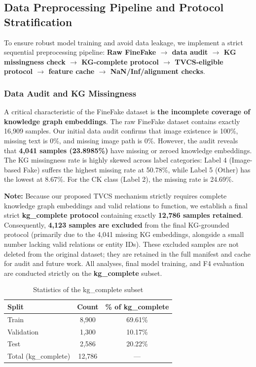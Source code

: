 \subsection{Data Preprocessing Pipeline and Protocol Stratification}

To ensure robust model training and avoid data leakage, we implement a strict sequential preprocessing pipeline: \textbf{Raw FineFake $\rightarrow$ data audit $\rightarrow$ KG missingness check $\rightarrow$ KG-complete protocol $\rightarrow$ TVCS-eligible protocol $\rightarrow$ feature cache $\rightarrow$ NaN/Inf/alignment checks}.

\subsubsection{Data Audit and KG Missingness}
A critical characteristic of the FineFake dataset is \textbf{the incomplete coverage of knowledge graph embeddings}. The raw FineFake dataset contains exactly 16,909 samples. Our initial data audit confirms that image existence is 100\%, missing text is 0\%, and missing image path is 0\%. However, the audit reveals that \textbf{4,041 samples (23.8985\%)} have missing or zeroed knowledge embeddings. The KG missingness rate is highly skewed across label categories: Label 4 (Image-based Fake) suffers the highest missing rate at 50.78\%, while Label 5 (Other) has the lowest at 8.67\%. For the CK class (Label 2), the missing rate is 24.69\%.

\textbf{Note:} Because our proposed TVCS mechanism strictly requires complete knowledge graph embeddings and valid relations to function, we establish a final strict \textbf{kg\_complete protocol} containing exactly \textbf{12,786 samples retained}. Consequently, \textbf{4,123 samples are excluded} from the final KG-grounded protocol (primarily due to the 4,041 missing KG embeddings, alongside a small number lacking valid relations or entity IDs). These excluded samples are not deleted from the original dataset; they are retained in the full manifest and cache for audit and future work. All analyses, final model training, and F4 evaluation are conducted strictly on the \textbf{kg\_complete} subset.

\begin{table}[!htbp]
\centering
\caption{Statistics of the kg\_complete subset}
\begin{tabularx}{\linewidth}{|X|c|c|}
\hline
\textbf{Split} & \textbf{Count} & \textbf{\% of kg\_complete} \\
\hline
Train & 8,900 & 69.61\% \\
\hline
Validation & 1,300 & 10.17\% \\
\hline
Test & 2,586 & 20.22\% \\
\hline
Total (kg\_complete) & 12,786 & — \\
\hline
\end{tabularx}
\end{table}

